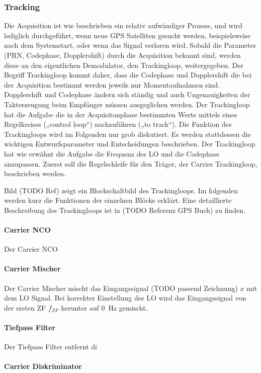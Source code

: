 \subsubsection{Tracking}
Die Acquisition ist wie beschrieben ein relativ aufwändiger Prozess, und wird lediglich durchgeführt, wenn neue GPS Satelliten gesucht werden, beispielsweise nach dem Systemstart, oder wenn das Signal verloren wird. Sobald die Parameter (PRN, Codephase, Dopplershift) durch die Acquisition bekannt sind, werden diese an den eigentlichen Demodulator, den Trackingloop, weitergegeben. Der Begriff Trackingloop kommt daher, dass die Codephase und Dopplershift die bei der Acquisition bestimmt werden jeweils nur Momentaufnahmen sind. Dopplershift und Codephase ändern sich ständig und auch Ungenauigkeiten der Takterzeugung beim Empfänger müssen ausgeglichen werden. Der Trackingloop hat die Aufgabe die in der Acquisitonphase bestimmten Werte mittels eines Regelkreises („control loop“) nachzuführen („to track“). 
Die Funktion des Trackingloops wird im Folgenden nur grob diskutiert. Es werden stattdessen die wichtigen Entwurfsparameter und Entscheidungen beschrieben. 
Der Trackingloop hat wie erwähnt die Aufgabe die Frequenz des LO und die Codephase anzupassen. Zuerst soll die Regelschleife für den Träger, der Carrier Trackingloop, beschrieben werden.

Bild (TODO Ref) zeigt ein Blockschaltbild des Trackingloops. Im folgenden werden kurz die Funktionen der einzelnen Blöcke erklärt. Eine detaillierte Beschreibung des Trackingloops ist in (TODO Referenz GPS Buch) zu finden.

\paragraph{Carrier NCO} Der Carrier \gls{NCO} 

\paragraph{Carrier Mischer} Der Carrier Mischer mischt das Eingangssignal (TODO passend Zeichnung) $x$ mit dem LO Signal. Bei korrekter Einstellung des LO wird das Eingangssignal von der ersten ZF $f_{ZF}$ herunter auf \SI{0}{\Hz} gemischt.

\paragraph{Tiefpass Filter} Der Tiefpass Filter entfernt di

\paragraph{Carrier Diskriminator}

